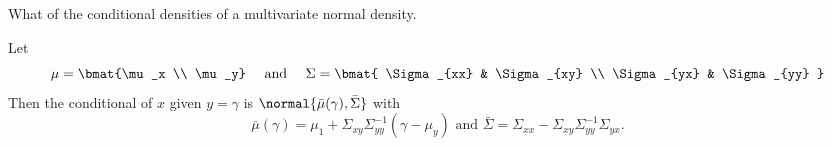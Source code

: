 

What of the conditional densities of
a multivariate normal density.


\begin{prop}
Let
\[
  \mu = \bmat{\mu_x \\ \mu_y} \quad \text{ and } \quad
  \Sigma = \bmat{
    \Sigma_{xx} & \Sigma_{xy} \\
    \Sigma_{yx} & \Sigma_{yy}
  }
\]
Then the conditional of $x$ given $y = \gamma$
is $\normal{\bar{\mu}(\gamma), \bar{\Sigma}}$
with
  \[
    \bar{\mu}(\gamma) = \mu_1 + \Sigma_{xy}\Sigma_{yy}^{-1}(\gamma - \mu_y) \text{ and } \bar{\Sigma} = \Sigma_{xx} - \Sigma_{xy}\Sigma_{yy}^{-1}\Sigma_{yx}.
  \]
\end{prop}
